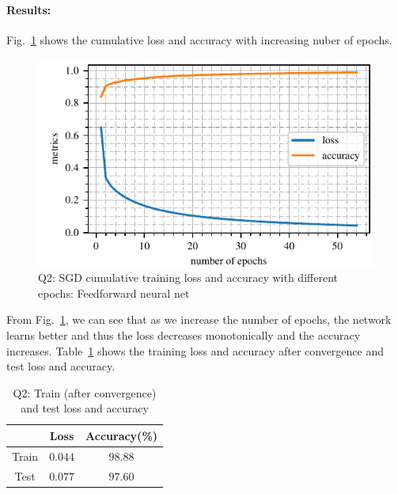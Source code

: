 \paragraph{Results:} Fig.~\ref{fig:q2_loss_acc} shows the cumulative loss and accuracy with increasing nuber of epochs.
\begin{figure}[!h]
	\centering
	\includegraphics[scale=1.0,trim={0cm 0cm 0cm 0cm},clip]{./code/generatedPlots/q2_loss_acc.pdf}
	\caption{Q2: SGD cumulative training loss and accuracy with different epochs: Feedforward neural net}
	\label{fig:q2_loss_acc}
\end{figure}
From Fig.~\ref{fig:q2_loss_acc}, we can see that as we increase the number of epochs, the network learns better and thus the loss decreases monotonically and the accuracy increases. Table~\ref{tbl:q2_sgd_loss_acc} shows the training loss and accuracy after convergence and test loss and accuracy.
\begin{table}[ht]
	\centering
	\caption{Q2: Train (after convergence) and test loss and accuracy}
	\begin{tabular}[t]{ccc} 
		\hline
		 			& Loss & Accuracy(\%)\\ [0.5ex] 
		\hline
		Train 	& $0.044$ 	& $98.88$\\
		Test 	& $0.077$ 	& $97.60$\\[1ex]
		\hline
	\end{tabular}
	\label{tbl:q2_sgd_loss_acc}
\end{table}